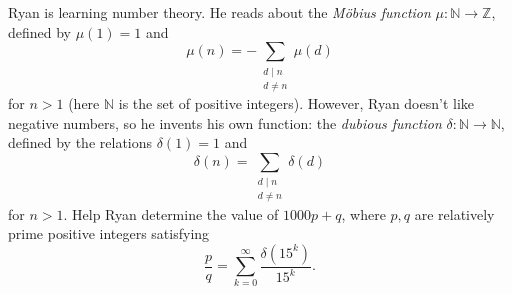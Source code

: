 Ryan is learning number theory. He reads about the \emph{M\"obius function} $\mu : \mathbb N \to \mathbb Z$, defined by $\mu(1)=1$ and
\[ \mu(n) = -\sum_{\substack{d\mid n \\ d \neq n}} \mu(d) \]
for $n>1$ (here $\mathbb N$ is the set of positive integers).
However, Ryan doesn't like negative numbers, so he invents his own function: the \emph{dubious function} $\delta : \mathbb N \to \mathbb N$, defined by the relations $\delta(1)=1$ and
\[ \delta(n) = \sum_{\substack{d\mid n \\ d \neq n}} \delta(d) \]
for $n > 1$. Help Ryan determine the value of $1000p+q$, where $p,q$ are relatively prime positive integers satisfying
\[ \frac{p}{q}=\sum_{k=0}^{\infty} \frac{\delta(15^k)}{15^k}.  \]
